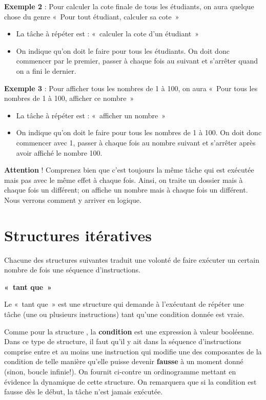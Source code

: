 {
\textbf{Exemple 2} : Pour calculer la cote finale de tous les étudiants,
on aura quelque chose du genre «~Pour tout étudiant, calculer sa
cote~»}

\liststyleListv
\begin{itemize}
\item {
La tâche à répéter est : «~calculer la cote d'un
étudiant~»}
\item {
On indique qu'on doit le faire pour tous les étudiants.
On doit donc commencer par le premier, passer à chaque fois au suivant
et s'arrêter quand on a fini le dernier.}
\end{itemize}
{
\textbf{Exemple 3} : Pour afficher tous les nombres de 1 à 100, on aura
«~Pour tous les nombres de 1 à 100, afficher ce nombre~»}

\liststyleListv
\begin{itemize}
\item {
La tâche à répéter est : «~afficher un nombre~»}
\item {
On indique qu'on doit le faire pour tous les nombres de
1 à 100. On doit donc commencer avec 1, passer à chaque fois au nombre
suivant et s'arrêter après avoir affiché le nombre
100.}
\end{itemize}
{
\textbf{Attention} ! Comprenez bien que c'est toujours
la même tâche qui est exécutée mais pas avec le même effet à chaque
fois. Ainsi, on traite un dossier mais à chaque fois un différent; on
affiche un nombre mais à chaque fois un différent. Nous verrons comment
y arriver en logique.}

\section{Structures itératives}
{
Chacune des structures suivantes traduit une volonté de faire exécuter
un certain nombre de fois une séquence d’instructions. }

{\sffamily\bfseries
«~tant que~»}

{
Le «~tant que~» est une structure qui demande à
l'exécutant de répéter une tâche (une ou plusieurs
instructions) tant qu'une condition donnée est vraie.}


\bigskip

{
Comme pour la structure , la \textbf{condition} est
une expression à valeur booléenne. Dans ce type de structure, il faut
qu’il y ait dans la séquence d’instructions comprise entre
 et  au moins une
instruction qui modifie une des composantes de la condition de telle
manière qu’elle puisse devenir \textbf{fausse} à un moment donné
(sinon, boucle infinie!). On fournit ci-contre un ordinogramme mettant
en évidence la dynamique de cette structure. On remarquera que si la
condition est fausse dès le début, la tâche n'est
jamais exécutée.}

